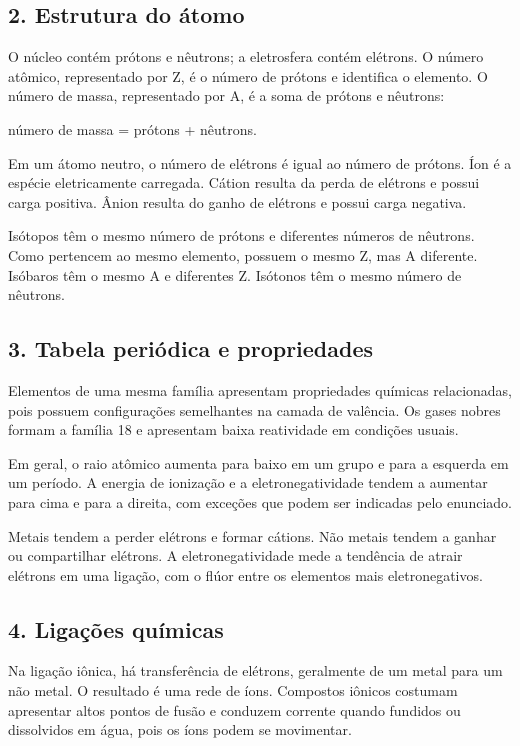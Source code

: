 \documentclass[11pt,a4paper]{article}
\begin{document}
\subsection*{2. Estrutura do átomo}

O núcleo contém prótons e nêutrons; a eletrosfera contém elétrons. O número atômico, representado por Z, é o número de prótons e identifica o elemento. O número de massa, representado por A, é a soma de prótons e nêutrons:

número de massa = prótons + nêutrons.

Em um átomo neutro, o número de elétrons é igual ao número de prótons. Íon é a espécie eletricamente carregada. Cátion resulta da perda de elétrons e possui carga positiva. Ânion resulta do ganho de elétrons e possui carga negativa.

Isótopos têm o mesmo número de prótons e diferentes números de nêutrons. Como pertencem ao mesmo elemento, possuem o mesmo Z, mas A diferente. Isóbaros têm o mesmo A e diferentes Z. Isótonos têm o mesmo número de nêutrons.

\subsection*{3. Tabela periódica e propriedades}

Elementos de uma mesma família apresentam propriedades químicas relacionadas, pois possuem configurações semelhantes na camada de valência. Os gases nobres formam a família 18 e apresentam baixa reatividade em condições usuais.

Em geral, o raio atômico aumenta para baixo em um grupo e para a esquerda em um período. A energia de ionização e a eletronegatividade tendem a aumentar para cima e para a direita, com exceções que podem ser indicadas pelo enunciado.

Metais tendem a perder elétrons e formar cátions. Não metais tendem a ganhar ou compartilhar elétrons. A eletronegatividade mede a tendência de atrair elétrons em uma ligação, com o flúor entre os elementos mais eletronegativos.

\subsection*{4. Ligações químicas}

Na ligação iônica, há transferência de elétrons, geralmente de um metal para um não metal. O resultado é uma rede de íons. Compostos iônicos costumam apresentar altos pontos de fusão e conduzem corrente quando fundidos ou dissolvidos em água, pois os íons podem se movimentar.
\end{document}
